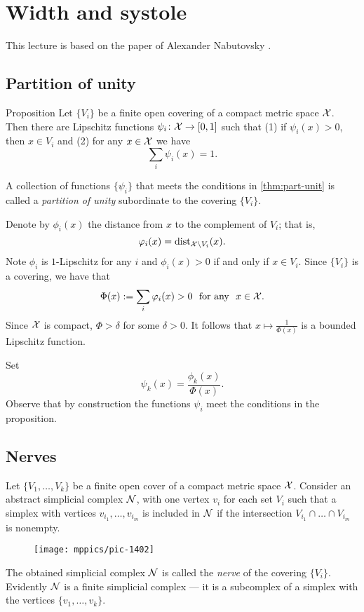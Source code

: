 \chapter{Width and systole}

This lecture is based on the paper of Alexander Nabutovsky \cite{nabutovsky}.

\section{Partition of unity}

\begin{thm}{Proposition}\label{thm:part-unit}
 Let $\{V_i\}$ be a finite open covering of a compact metric space ${\mathcal{X}}$.
Then there are Lipschitz functions $\psi_i\:{\spc{X}}\z\to[0,1]$ such that (1) if $\psi_i(x)>0$, then $x\in V_i$ and (2) for any $x\in {\mathcal{X}}$ we have
$$\sum_i\psi_i(x)=1.$$

\end{thm}

A collection of functions $\{\psi_i\}$ that meets the conditions in \ref{thm:part-unit} is called 
a \emph{partition of unity} subordinate to the covering $\{V_i\}$.

Denote by $\phi_i(x)$ the distance from $x$ to the complement of $V_i$;
that is,
$$\varphi_i(x)=\mathrm{dist}_{{\mathcal{X}}\setminus V_i}(x).$$
Note $\phi_i$ is $1$-Lipschitz
for any $i$
and $\phi_i(x)>0$ if and only if $x\in V_i$.
Since $\{V_i\}$ is a covering, we have that
$$\Phi(x)\df\sum_i\phi_i(x)>0\ \ \text{for any}\ \ x\in {\spc{X}}.$$
Since $\mathcal{X}$ is compact, $\Phi>\delta$ for some $\delta>0$.
It follows that $x\mapsto\tfrac1{\Phi(x)}$ is a bounded Lipschitz function. 

Set 
$$\psi_k(x)=\frac{\phi_k(x)}{\Phi(x)}.$$
Observe that by construction the functions $\psi_i$ meet the conditions in the proposition.
\qedsf

\section{Nerves}

Let $\{V_1,\dots,V_k\}$ be a finite open cover of a compact metric space $\mathcal{X}$.
Consider an abstract simplicial complex $\mathcal{N}$, with one vertex $v_i$ for each set $V_i$ such that a simplex with vertices $v_{i_1},\dots, v_{i_m}$ is included in $\mathcal{N}$ if 
the intersection $V_{i_1}\cap\dots\cap V_{i_m}$ is nonempty.
\begin{figure}[ht!]
\vskip-0mm
\centering
\texttt{[image: mppics/pic-1402]}
\end{figure}
The obtained simplicial complex $\mathcal{N}$ is called the \emph{nerve} of the covering $\{V_i\}$.
Evidently $\mathcal{N}$ is a finite simplicial complex ---
it is a subcomplex of a simplex with the vertices $\{v_1,\dots,v_k\}$.

